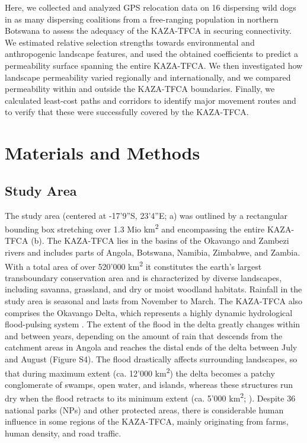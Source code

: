 \documentclass[abstract=on,10pt,a4paper,bibliography=totocnumbered]{article}
\begin{document}
Here, we collected and analyzed GPS relocation data on 16 dispersing wild dogs
in as many dispersing coalitions from a free-ranging population in northern
Botswana to assess the adequacy of the KAZA-TFCA in securing connectivity. We
estimated relative selection strengths towards environmental and anthropogenic
landscape features, and used the obtained coefficients to predict a permeability
surface spanning the entire KAZA-TFCA. We then investigated how landscape
permeability varied regionally and internationally, and we compared permeability
within and outside the KAZA-TFCA boundaries. Finally, we calculated least-cost
paths and corridors to identify major movement routes and to verify that these
were successfully covered by the KAZA-TFCA.

\section{Materials and Methods}
\subsection{Study Area}
The study area (centered at -17'9''S, 23'4''E;
a) was outlined by a rectangular bounding box stretching over
1.3 Mio km\textsuperscript{2} and encompassing the entire KAZA-TFCA
(b). The KAZA-TFCA lies in the basins of the Okavango and
Zambezi rivers and includes parts of Angola, Botswana, Namibia, Zimbabwe, and
Zambia. With a total area of over 520'000 km\textsuperscript{2} it constitutes
the earth's largest transboundary conservation area and is characterized by
diverse landscapes, including savanna, grassland, and dry or moist woodland
habitats. Rainfall in the study area is seasonal and lasts from November to
March. The KAZA-TFCA also comprises the Okavango Delta, which represents a
highly dynamic hydrological flood-pulsing system \citep{McNutt.1996,
Wolski.2017}. The extent of the flood in the delta greatly changes within and
between years, depending on the amount of rain that descends from the catchment
areas in Angola and reaches the distal ends of the delta between July and August
(Figure S4). The flood drastically affects surrounding landscapes, so that
during maximum extent (ca. 12'000 km\textsuperscript{2}) the delta becomes a
patchy conglomerate of swamps, open water, and islands, whereas these structures
run dry when the flood retracts to its minimum extent (ca. 5'000
km\textsuperscript{2}; \citealp{Wolski.2017}). Despite 36 national parks (NPs)
and other protected areas, there is considerable human influence in some regions
of the KAZA-TFCA, mainly originating from farms, human density, and road
traffic.
\end{document}
